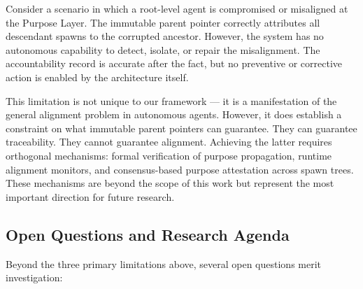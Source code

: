 Consider a scenario in which a root-level agent is compromised or misaligned at the Purpose Layer. The immutable parent pointer correctly attributes all descendant spawns to the corrupted ancestor. However, the system has no autonomous capability to detect, isolate, or repair the misalignment. The accountability record is accurate after the fact, but no preventive or corrective action is enabled by the architecture itself.

This limitation is not unique to our framework — it is a manifestation of the general alignment problem in autonomous agents. However, it does establish a constraint on what immutable parent pointers can guarantee. They can guarantee traceability. They cannot guarantee alignment. Achieving the latter requires orthogonal mechanisms: formal verification of purpose propagation, runtime alignment monitors, and consensus-based purpose attestation across spawn trees. These mechanisms are beyond the scope of this work but represent the most important direction for future research.

\subsection{Open Questions and Research Agenda}
\label{sec:limitations:research-agenda}

Beyond the three primary limitations above, several open questions merit investigation:

